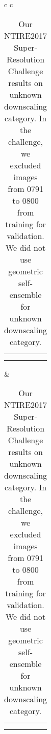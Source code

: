 \documentclass[10pt,twocolumn,letterpaper]{article}
\begin{document}
\begin{table}[t]
\begin{figure*}[t]
\begin{center}
			\begin{tabular}[b]{c c}
				\begin{tabular}[b]{c c c}
					\multirow{2}{*}[\rowArg]{
						\subfloat[0793 from DIV2K~\cite{Timofte_2017_CVPR_Workshops}]
						{\includegraphics[width = \fullHalf, height = \fullSize]
							{figs/val_0793_Full_cut.png}}} &
					\subfloat[HR \protect\linebreak(PSNR / SSIM)]
					{\includegraphics[width = \patchSize, height = \patchSize]
						{figs/val_0793_GT.png}} &
					\subfloat[Bicubic \protect\linebreak(23.81 dB / 0.8053)]
					{\includegraphics[width = \patchSize, height = \patchSize]
						{figs/val_0793_Bicubic.png}} \\ [-0.2cm] &
					\subfloat[\textbf{EDSR (Ours)} \protect\linebreak(\textcolor{red}{30.94 dB} / \textcolor{red}{0.9318})]
					{\includegraphics[width = \patchSize, height = \patchSize]
						{figs/val_0793_Ours_Single.png}} &
					\subfloat[\textbf{MDSR (Ours)} \protect\linebreak(\textcolor{blue}{30.81 dB} / \textcolor{blue}{0.9301})]
					{\includegraphics[width = \patchSize, height = \patchSize]
						{figs/val_0793_Ours_Multi.png}} \\
				\end{tabular}
				&  
				\begin{tabular}[b]{c c c}
					\multirow{2}{*}[\rowArg]{
						\subfloat[0797 from DIV2K~\cite{Timofte_2017_CVPR_Workshops}]
						{\includegraphics[width = \fullHalf, height = \fullSize]
							{figs/val_0797_Full_cut.png}}} &
					\subfloat[HR \protect\linebreak(PSNR / SSIM)]
					{\includegraphics[width = \patchSize, height = \patchSize]
						{figs/val_0797_GT.png}} &
					\subfloat[Bicubic \protect\linebreak(19.77 dB / 0.8937)]
					{\includegraphics[width = \patchSize, height = \patchSize]
						{figs/val_0797_Bicubic.png}} \\ [-0.2cm] &
					\subfloat[\textbf{EDSR (Ours)} \protect\linebreak(\textcolor{red}{25.48 dB} / \textcolor{red}{0.9597})]
					{\includegraphics[width = \patchSize, height = \patchSize]
						{figs/val_0797_Ours_Single.png}} &
					\subfloat[\textbf{MDSR (Ours)} \protect\linebreak(\textcolor{blue}{25.38 dB} / \textcolor{blue}{0.9590})]
					{\includegraphics[width = \patchSize, height = \patchSize]
						{figs/val_0797_Ours_Multi.png}} \\
				\end{tabular}
			\end{tabular}
		\end{center}
		\captionsetup{justification=raggedright,singlelinecheck=false}
		\caption{Our NTIRE2017 Super-Resolution Challenge results on unknown downscaling  category. In the challenge, we excluded images from 0791 to 0800 from training for validation. We did not use geometric self-ensemble for unknown downscaling category.}
		\label{fig_result_unknown}
	\end{figure*}
	

\end{table}
\end{document}
